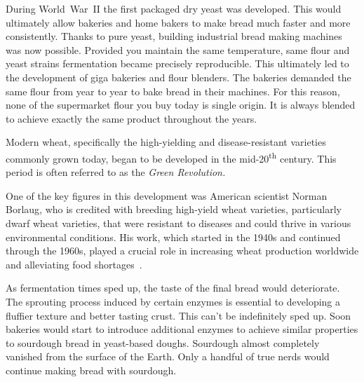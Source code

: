 During World~War~II the first packaged dry yeast was developed. This would
ultimately allow bakeries and home bakers to make bread much faster and more
consistently. Thanks to pure yeast, building industrial bread making machines
was now possible. Provided you maintain the same temperature, same flour and
yeast strains fermentation became precisely reproducible. This ultimately led
to the development of giga bakeries and flour blenders. The bakeries demanded
the same flour from year to year to bake bread in their machines.  For this
reason, none of the supermarket flour you buy today is single origin.  It is
always blended to achieve exactly the same product throughout the years.

Modern wheat, specifically the high-yielding and disease-resistant varieties
commonly grown today, began to be developed in the mid-20\textsuperscript{th}
century. This period is often referred to as the \emph{Green Revolution.}

One of the key figures in this development was American scientist Norman
Borlaug, who is credited with breeding high-yield wheat varieties,
particularly dwarf wheat varieties, that were resistant to diseases and could
thrive in various environmental conditions. His work, which started in the
1940s and continued through the \num{1960}s, played a crucial role in
increasing wheat production worldwide and alleviating food
shortages~\cite{green+revolution}.

As fermentation
times sped up, the taste of the final bread would deteriorate.
The sprouting process induced by certain enzymes is essential
to developing a fluffier texture and better tasting crust. This
can't be indefinitely sped up. Soon bakeries would start
to introduce additional enzymes to achieve similar properties
to sourdough bread in yeast-based doughs. Sourdough almost completely
vanished from the surface of the Earth. Only a handful
of true nerds would continue making bread with sourdough.

